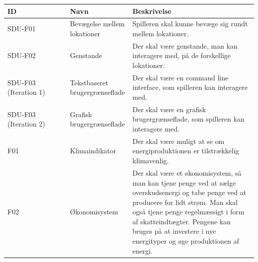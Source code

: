 \documentclass[a4paper,12pt]{report}
\begin{document}
\begin{table}[H]
\begin{tabular}{|p{0.25\linewidth}|p{0.25\linewidth}||p{0.5\linewidth}|}
\hline
\textbf{ID}           & \textbf{Navn}                  & \textbf{Beskrivelse}                                                                                                                                                                                                                                                                     \\ \hline
SDU-F01               & Bevægelse mellem lokationer    & Spilleren skal kunne bevæge sig rundt mellem lokationer.                                                                                                                                                                                                                                 \\ \hline
SDU-F02               & Genstande                      & Der skal være genstande, man kan interagere med, på de forskellige lokationer.                                                                                                                                                                                                           \\ \hline
SDU-F03 (Iteration 1) & Tekstbaseret brugergrænseflade & Der skal være en command line interface, som spilleren kan interagere med.                                                                                                                                                                                                               \\ \hline
SDU-F03 (Iteration 2) & Grafisk brugergrænseflade      & Der skal være en grafisk brugergrænseflade, som spilleren kan interagere med.                                                                                                                                                                                                            \\ \hline
F01                   & Klimaindikator                 & Der skal være muligt at se om energiproduktionen er tilstrækkelig klimavenlig.                                                                                                                                                                                                           \\ \hline
F02                   & Økonomisystem                  & Der skal være et økonomisystem, så man kan tjene penge ved at sælge overskudsenergi og tabe penge ved at producere for lidt strøm. Man skal også tjene penge regelmæssigt i form af skatteindtægter. Pengene kan bruges på at investere i nye energityper og øge produktionen af energi. \\ \hline

\end{tabular}
\end{table}
\end{document}
